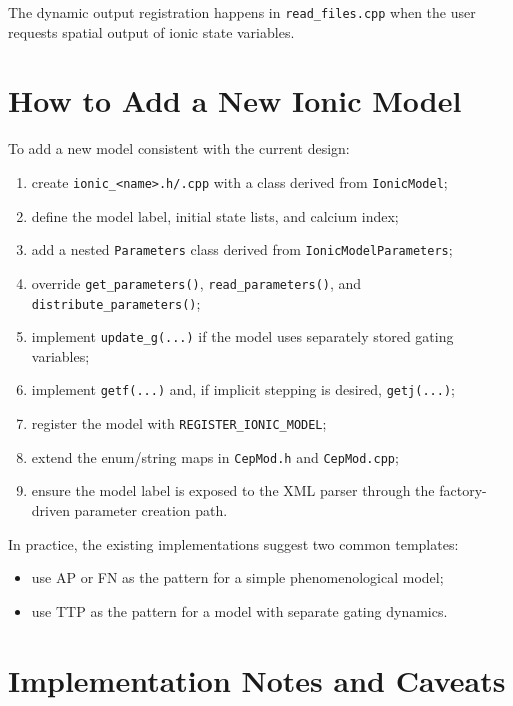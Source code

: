 \documentclass[11pt]{article}
\begin{document}
The dynamic output registration happens in \texttt{read\_files.cpp} when the user requests spatial output of ionic state variables.

\section{How to Add a New Ionic Model}

To add a new model consistent with the current design:
\begin{enumerate}[leftmargin=*]
\item create \texttt{ionic\_<name>.h/.cpp} with a class derived from \texttt{IonicModel};
\item define the model label, initial state lists, and calcium index;
\item add a nested \texttt{Parameters} class derived from \texttt{IonicModelParameters};
\item override \texttt{get\_parameters()}, \texttt{read\_parameters()}, and \texttt{distribute\_parameters()};
\item implement \texttt{update\_g(...)} if the model uses separately stored gating variables;
\item implement \texttt{getf(...)} and, if implicit stepping is desired, \texttt{getj(...)};
\item register the model with \texttt{REGISTER\_IONIC\_MODEL};
\item extend the enum/string maps in \texttt{CepMod.h} and \texttt{CepMod.cpp};
\item ensure the model label is exposed to the XML parser through the factory-driven parameter creation path.
\end{enumerate}

In practice, the existing implementations suggest two common templates:
\begin{itemize}[leftmargin=*]
\item use AP or FN as the pattern for a simple phenomenological model;
\item use TTP as the pattern for a model with separate gating dynamics.
\end{itemize}

\section{Implementation Notes and Caveats}
\end{document}
